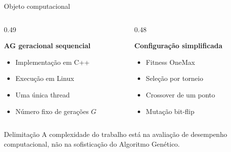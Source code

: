 \documentclass[aspectratio=169,11pt]{beamer}
\begin{document}
\begin{frame}{Objeto computacional}

    \begin{columns}[T,onlytextwidth]

        \begin{column}{0.49\textwidth}

            \textbf{AG geracional sequencial}

            \begin{itemize}
                \item Implementação em C++
                \item Execução em Linux
                \item Uma única thread
                \item Número fixo de gerações $G$
            \end{itemize}

        \end{column}

        \begin{column}{0.48\textwidth}

            \textbf{Configuração simplificada}

            \begin{itemize}
                \item Fitness OneMax
                \item Seleção por torneio
                \item Crossover de um ponto
                \item Mutação bit-flip
            \end{itemize}

        \end{column}

    \end{columns}

    \vspace{0.25cm}

    \begin{impactbox}{Delimitação}
        A complexidade do trabalho está na avaliação de desempenho computacional,
        não na sofisticação do Algoritmo Genético.
    \end{impactbox}

\end{frame}

\end{document}
